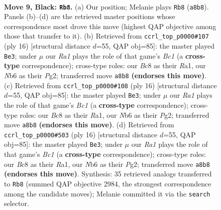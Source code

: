 \documentclass[11pt]{article}
\begin{document}
\clearpage

\begin{figure}[p]\centering
\begin{subfigure}{0.46\textwidth}\centering
\resizebox{\linewidth}{!}{%
\newchessgame
\chessboard[
  setfen={r1bq1rk1/ppp1bppp/1nn5/4p3/P3P2P/2N2NP1/1P1P1PB1/R1BQK2R b KQ - 0 9},
  showmover=false,
  pgfstyle=straightmove, color=movearrow, markmove={a8-b8}
]}
\caption{}
\end{subfigure}\hfill
\begin{subfigure}{0.46\textwidth}\centering
\resizebox{\linewidth}{!}{%
\newchessgame
\chessboard[
  setfen={rnbq1rk1/1p2bppp/p2p1n2/4p3/4P3/1NN5/PPP1BPPP/R1BQ1RK1 w - - 4 9},
  showmover=false,
  pgfstyle=straightmove, color=movearrow, markmove={c1-e3}
]}
\caption{}
\end{subfigure}
\\[4pt]
\begin{subfigure}{0.46\textwidth}\centering
\resizebox{\linewidth}{!}{%
\newchessgame
\chessboard[
  setfen={rnbq1rk1/1p2bppp/p2p1n2/4p3/4P3/1NN5/PPP1BPPP/R1BQ1RK1 w - - 4 9},
  showmover=false,
  pgfstyle=straightmove, color=movearrow, markmove={c1-e3}
]}
\caption{}
\end{subfigure}\hfill
\begin{subfigure}{0.46\textwidth}\centering
\resizebox{\linewidth}{!}{%
\newchessgame
\chessboard[
  setfen={rnbq1rk1/1p2bppp/p2p1n2/4p3/4P3/1NN5/PPP1BPPP/R1BQ1RK1 w - - 4 9},
  showmover=false,
  pgfstyle=straightmove, color=movearrow, markmove={c1-e3}
]}
\caption{}
\end{subfigure}
\caption{\textbf{Move 9, Black: \texttt{Rb8}.} (a) Our position; Melanie plays \texttt{Rb8} (\texttt{a8b8}). Panels (b)--(d) are the retrieved master positions whose correspondence most drove this move (highest QAP objective among those that transfer to it). (b) Retrieved from \texttt{ccrl\_top\_p0000\#107} (ply 16) [structural distance $d$=55, QAP obj=85]: the master played \texttt{Be3}; under $\mu$ our \emph{Ra1} plays the role of that game's \emph{Bc1} (a \textbf{cross-type} correspondence); cross-type roles: our \emph{B}c8 as their \emph{R}a1, our \emph{N}b6 as their \emph{P}g2; transferred move \texttt{a8b8} \textbf{(endorses this move)}. (c) Retrieved from \texttt{ccrl\_top\_p0000\#108} (ply 16) [structural distance $d$=55, QAP obj=85]: the master played \texttt{Be3}; under $\mu$ our \emph{Ra1} plays the role of that game's \emph{Bc1} (a \textbf{cross-type} correspondence); cross-type roles: our \emph{B}c8 as their \emph{R}a1, our \emph{N}b6 as their \emph{P}g2; transferred move \texttt{a8b8} \textbf{(endorses this move)}. (d) Retrieved from \texttt{ccrl\_top\_p0000\#503} (ply 16) [structural distance $d$=55, QAP obj=85]: the master played \texttt{Be3}; under $\mu$ our \emph{Ra1} plays the role of that game's \emph{Bc1} (a \textbf{cross-type} correspondence); cross-type roles: our \emph{B}c8 as their \emph{R}a1, our \emph{N}b6 as their \emph{P}g2; transferred move \texttt{a8b8} \textbf{(endorses this move)}. Synthesis: 35 retrieved analogs transferred to \texttt{Rb8} (summed QAP objective 2984, the strongest correspondence among the candidate moves); Melanie committed it via the \texttt{search} selector.}
\label{fig:thought-m17}
\end{figure}
\end{document}
